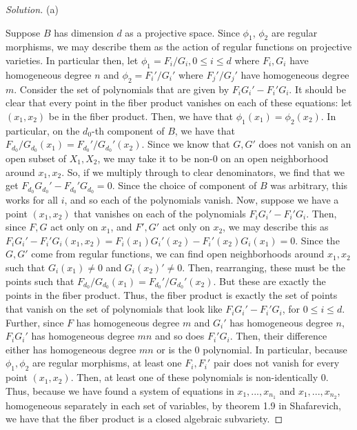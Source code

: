 \documentclass[10pt]{article}
\begin{document}
\begin{proof}[Solution]

(a)

Suppose $B$ has dimension $d$ as a projective space. Since $\phi_1$, $\phi_2$ are regular morphisms, we may describe them as the action of regular functions on projective varieties. In particular then, let $\phi_1 = F_i/G_i, 0 \leq i \leq d$ where $F_i,G_i$ have  homogeneous degree $n$ and $\phi_2 = F_i'/G_i'$ where $F_j'/G_j'$ have homogeneous degree $m$. Consider the set of polynomials that are given by $F_iG_i' - F_i' G_i$. It should be clear that every point in the fiber product vanishes on each of these equations: let $(x_1,x_2)$ be in the fiber product. Then, we have that $\phi_1(x_1) = \phi_2(x_2)$. In particular, on the $d_0$-th component of $B$, we have that $F_{d_0}/G_{d_0}(x_1) = F_{d_0}'/G_{d_0}'(x_2)$. Since we know that $G, G'$ does not vanish on an open subset of $X_1, X_2$, we may take it to be non-0 on an open neighborhood around $x_1,x_2$. So, if we multiply through to clear denominators, we find that we get $F_{d_0}G_{d_0}' - F_{d_0}'G_{d_0} = 0$. Since the choice of component of $B$ was arbitrary, this works for all $i$, and so each of the polynomials vanish. Now, suppose we have a point $(x_1,x_2)$ that vanishes on each of the polynomials $F_iG_i' - F_i' G_i$. Then, since $F,G$ act only on $x_1$, and $F',G'$ act only on $x_2$, we may describe this as $F_iG_i' - F_i' G_i(x_1,x_2) = F_i(x_1)G_i'(x_2) - F_i'(x_2) G_i(x_1) = 0$. Since the $G, G'$ come from regular functions, we can find open neighborhoods around $x_1,x_2$ such that $G_i(x_1) \not = 0$ and $G_i(x_2)' \not = 0$. Then, rearranging, these must be the points such that $F_{d_0}/G_{d_0}(x_1) = F_{d_0}'/G_{d_0}'(x_2)$. But these are exactly the points in the fiber product. Thus, the fiber product is exactly the set of points that vanish on the set of polynomials that look like $F_iG_i' - F_i' G_i$, for $0 \leq i \leq d$. Further, since $F$ has homogeneous degree $m$ and $G_i'$ has homogeneous degree $n$, $F_iG_i'$ has homogeneous degree $mn$ and so does $F_i'G_i$. Then, their difference either has homogeneous degree $mn$ or is the 0 polynomial. In particular, because $\phi_1,\phi_2$ are regular morphisms, at least one $F_i,F_i'$ pair does not vanish for every point $(x_1,x_2)$. Then, at least one of these polynomials is non-identically 0. Thus, because we have found a system of equations in $x_1,...,x_{n_1}$ and $x_1,...,x_{n_2}$, homogeneous separately in each set of variables, by theorem 1.9 in Shafarevich, we have that the fiber product is a closed algebraic subvariety.


\end{proof}
\end{document}
